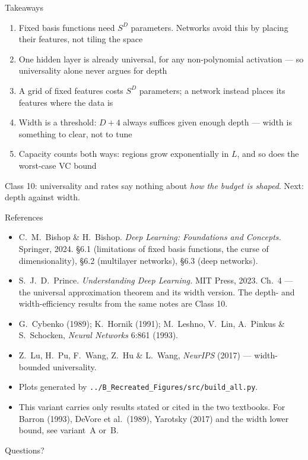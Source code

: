 \documentclass[aspectratio=169, 11pt]{beamer}
\begin{document}
\begin{frame}{Takeaways}
  \vspace{0.1em}
  {\footnotesize
  \begin{enumerate}\setlength{\itemsep}{2pt}
    \item Fixed basis functions need $S^{D}$ parameters. Networks avoid
          this by \alert{placing their features}, not tiling the space
    \item One hidden layer is already universal, for any
          non-polynomial activation --- so \alert{universality alone
          never argues for depth}
    \item A grid of fixed features costs $S^{D}$ parameters; a network
          instead \alert{places} its features where the data is
    \item \alert{Width is a threshold}: $D+4$ always suffices given
          enough depth --- width is something to clear, not to tune
    \item Capacity counts both ways: regions grow exponentially in $L$,
          and so does the worst-case \alert{VC bound}
  \end{enumerate}}
  \vspace{-0.1em}
  \begin{redhighlight}
    {\scriptsize Class 10: universality and rates say nothing about
    \emph{how the budget is shaped}. Next: depth against width.}
  \end{redhighlight}
\end{frame}

\begin{frame}{References}
  \scriptsize
  \begin{itemize}\setlength{\itemsep}{0pt}
    \item C.~M.~Bishop \& H.~Bishop. \textit{Deep Learning: Foundations
          and Concepts.} Springer, 2024. \S6.1 (limitations of fixed
          basis functions, the curse of dimensionality), \S6.2
          (multilayer networks), \S6.3 (deep networks).
    \item S.~J.~D.~Prince. \textit{Understanding Deep Learning.}
          MIT Press, 2023. Ch.~4 --- the universal approximation
          theorem and its width version. The depth- and
          width-efficiency results from the same notes are Class 10.
    \item G.~Cybenko (1989); K.~Hornik (1991); M.~Leshno, V.~Lin,
          A.~Pinkus \& S.~Schocken, \textit{Neural Networks} 6:861
          (1993).
    \item Z.~Lu, H.~Pu, F.~Wang, Z.~Hu \& L.~Wang, \textit{NeurIPS}
          (2017) --- width-bounded universality.
    \item Plots generated by
          \texttt{../B\_Recreated\_Figures/src/build\_all.py}.
    \item This variant carries only results stated or cited in the two
          textbooks. For Barron (1993), DeVore et al.\ (1989), Yarotsky
          (2017) and the width lower bound, see variant~A or~B.
  \end{itemize}
\end{frame}

\begin{frame}[standout]
  Questions?
\end{frame}
\end{document}
